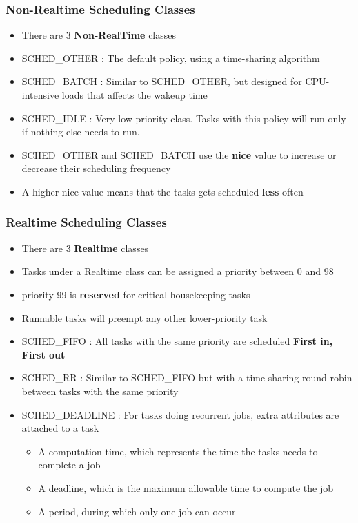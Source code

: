 \begin{frame}
	\frametitle{Non-Realtime Scheduling Classes}
	\begin{itemize}
		\item There are 3 \textbf{Non-RealTime} classes
		\item SCHED\_OTHER : The default policy, using a time-sharing algorithm
		\item SCHED\_BATCH : Similar to SCHED\_OTHER, but designed for CPU-intensive loads that affects the wakeup time
		\item SCHED\_IDLE : Very low priority class. Tasks with this policy will run only if nothing else needs to run.
		\item SCHED\_OTHER and SCHED\_BATCH use the \textbf{nice} value to increase or decrease their scheduling frequency
		\item A higher nice value means that the tasks gets scheduled \textbf{less} often
	\end{itemize}
\end{frame}

\begin{frame}
	\frametitle{Realtime Scheduling Classes}
	\begin{itemize}
		\item There are 3 \textbf{Realtime} classes
		\item Tasks under a Realtime class can be assigned a priority between 0 and 98
		\item priority 99 is \textbf{reserved} for critical housekeeping tasks
		\item Runnable tasks will preempt any other lower-priority task
		\item SCHED\_FIFO : All tasks with the same priority are scheduled \textbf{First in, First out}
		\item SCHED\_RR : Similar to SCHED\_FIFO but with a time-sharing round-robin between tasks with the same priority
		\item SCHED\_DEADLINE : For tasks doing recurrent jobs, extra attributes are attached to a task
			\begin{itemize}
				\item A computation time, which represents the time the tasks needs to complete a job
				\item A deadline, which is the maximum allowable time to compute the job
				\item A period, during which only one job can occur
			\end{itemize}
	\end{itemize}
\end{frame}

